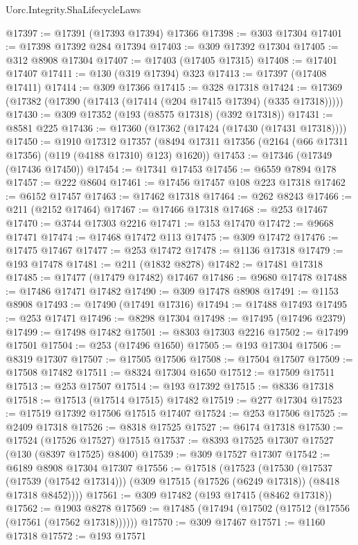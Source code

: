 \begin{lexlean}{Uorc.Integrity.ShaLifecycleLaws}
\begin{coremodule}
@17397 := @17391 (@17393 @17394) @17366
@17398 := @303 @17304
@17401 := @17398 @17392 @284 @17394
@17403 := @309 @17392 @17304
@17405 := @312 @8908 @17304
@17407 := @17403 (@17405 @17315)
@17408 := @17401 @17407
@17411 := @130 (@319 @17394) @323
@17413 := @17397 (@17408 @17411)
@17414 := @309 @17366
@17415 := @328 @17318
@17424 := @17369 (@17382 (@17390 (@17413 (@17414 (@204 @17415 @17394) (@335 @17318)))))
@17430 := @309 @17352 (@193 (@8575 @17318) (@392 @17318))
@17431 := @8581 @225
@17436 := @17360 (@17362 (@17424 (@17430 (@17431 @17318))))
@17450 := @1910
    @17312
    @17357
    (@8494 @17311 @17356 (@2164 (@66 @17311 @17356) (@119 (@4188 @17310) @123) @1620))
@17453 := @17346 (@17349 (@17436 @17450))
@17454 := @17341 @17453
@17456 := @6559 @7894 @178
@17457 := @222 @8604
@17461 := @17456 @17457 @108 @223 @17318
@17462 := @6152 @17457
@17463 := @17462 @17318
@17464 := @262 @8243
@17466 := @211 (@2152 @17464)
@17467 := @17466 @17318
@17468 := @253 @17467
@17470 := @3744 @17303 @2216
@17471 := @153 @17470
@17472 := @9668 @17471
@17474 := @17468 @17472 @113
@17475 := @309 @17472
@17476 := @17475 @17467
@17477 := @253 @17472
@17478 := @1136 @17318
@17479 := @193 @17478
@17481 := @211 (@1832 @8278)
@17482 := @17481 @17318
@17485 := @17477 (@17479 @17482) @17467
@17486 := @9680 @17478
@17488 := @17486 @17471 @17482
@17490 := @309 @17478 @8908
@17491 := @1153 @8908
@17493 := @17490 (@17491 @17316)
@17494 := @17488 @17493
@17495 := @253 @17471
@17496 := @8298 @17304
@17498 := @17495 (@17496 @2379)
@17499 := @17498 @17482
@17501 := @8303 @17303 @2216
@17502 := @17499 @17501
@17504 := @253 (@17496 @1650)
@17505 := @193 @17304
@17506 := @8319 @17307
@17507 := @17505 @17506
@17508 := @17504 @17507
@17509 := @17508 @17482
@17511 := @8324 @17304 @1650
@17512 := @17509 @17511
@17513 := @253 @17507
@17514 := @193 @17392
@17515 := @8336 @17318
@17518 := @17513 (@17514 @17515) @17482
@17519 := @277 @17304
@17523 := @17519 @17392 @17506 @17515 @17407
@17524 := @253 @17506
@17525 := @2409 @17318
@17526 := @8318 @17525
@17527 := @6174 @17318
@17530 := @17524 (@17526 @17527) @17515
@17537 := @8393 @17525 @17307 @17527 (@130 (@8397 @17525) @8400)
@17539 := @309 @17527 @17307
@17542 := @6189 @8908 @17304 @17307
@17556 := @17518
    (@17523
      (@17530
        (@17537 (@17539 (@17542 @17314)))
        (@309 @17515 (@17526 (@6249 @17318)) (@8418 @17318 @8452))))
@17561 := @309 @17482 (@193 @17415 (@8462 @17318))
@17562 := @1903 @8278
@17569 := @17485 (@17494 (@17502 (@17512 (@17556 (@17561 (@17562 @17318))))))
@17570 := @309 @17467
@17571 := @1160 @17318
@17572 := @193 @17571

\end{coremodule}
\end{lexlean}
